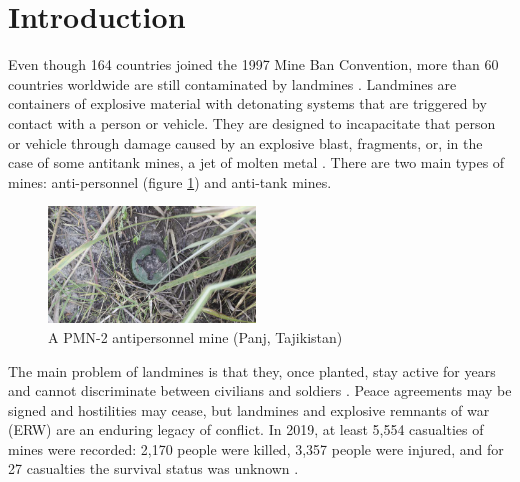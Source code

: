\documentclass[conference]{IEEEtran}
\begin{document}
\section{Introduction \label{sec:Introduction}}
Even though 164 countries joined the 1997 Mine Ban Convention, more than 60 countries worldwide are still contaminated by landmines \cite{InternationalCampaigntoBanLandmines2016} \cite{InternationalCampaigntoBanLandmines2020}. Landmines are containers of explosive material with detonating systems that are triggered by contact with a person or vehicle. They are designed to incapacitate that person or vehicle through damage caused by an explosive blast, fragments, or, in the case of some antitank mines, a jet of molten metal \cite{Chiovelli2018}. There are two main types of mines: anti-personnel (figure \ref{fig:anti-personnelmine}) and anti-tank mines.

\begin{figure}[htbp]
\centerline{\includegraphics[width=55mm]{PMN-2s.png}}
\caption{A PMN-2 antipersonnel mine (Panj, Tajikistan) \cite{InternationalCampaigntoBanLandmines2020a}}
\label{fig:anti-personnelmine}
\end{figure}

The main problem of landmines is that they, once planted, stay active for years and cannot discriminate between civilians and soldiers \cite{Hiznay2003}. Peace agreements may be signed and hostilities may cease, but landmines and explosive remnants of war (ERW) are an enduring legacy of conflict. In 2019, at least 5,554 casualties of mines were recorded: 2,170 people were killed, 3,357 people were injured, and for 27 casualties the survival status was unknown \cite{InternationalCampaigntoBanLandmines2020}. \\
\end{document}
